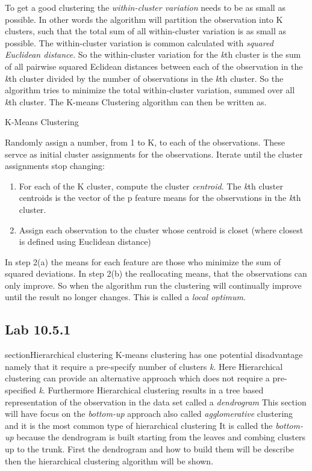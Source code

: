 To get a good clustering the \emph{within-cluster variation} needs to be as small as possible. In other words the algorithm will partition the observation into K clusters, such that the total sum of all within-cluster variation is as small as possible. The within-cluster variation is common calculated with \emph{squared Euclidean distance}.
So the within-cluster variation for the \emph{k}th cluster is the sum of all pairwise squared Eclidean distances between each of the observation in the \emph{k}th cluster divided by the number of observations in the \emph{k}th cluster.
So the algorithm tries to minimize the total within-cluster variation, summed over all \emph{k}th cluster.
The K-means Clustering algorithm can then be written as.

\begin{algorithm}
	\caption{K-Means Clustering}
	\label{algo:KMeansClustering}
	\begin{algorithmic}[1]
		\State Randomly assign a number, from 1 to K, to each of the observations. These servce as initial cluster assignments for the observations. 
		\State Iterate until the cluster assignments stop changing:
		\begin{enumerate}[label=(\alph*)]
			\item For each of the K cluster, compute the cluster \emph{centroid}. The \emph{k}th cluster centroids is the vector of the p feature means for the observations in the \emph{k}th cluster.
			\item Assign each observation to the cluster whose centroid is closet (where closest is defined using Euclidean distance) 
		\end{enumerate}
	\end{algorithmic}
\end{algorithm}

 In step 2(a) the means for each feature are those who minimize the sum of squared deviations. In step 2(b) the reallocating means, that the observations can only improve.
 So when the algorithm run the clustering will continually improve until the result no longer changes. This is called a \emph{local optimum}.
\subsection{Lab 10.5.1}

section{Hierarchical clustering}
K-means clustering has one potential disadvantage namely that it require a pre-specify number of clusters \emph{k}. Here Hierarchical clustering can provide an alternative approach which does not require a pre-specified \emph{k}.
Furthermore Hierarchical clustering results in a tree based representation of the observation in the data set called a \emph{dendrogram}
This section will have focus on the \emph{bottom-up} approach also called \emph{agglomerative} clustering and it is the most common type of hierarchical clustering It is called the \emph{bottom-up} because the dendrogram is built starting from the leaves and combing clusters up to the trunk. 
First the dendrogram and how to build them will be describe then the hierarchical clustering algorithm will be shown.

